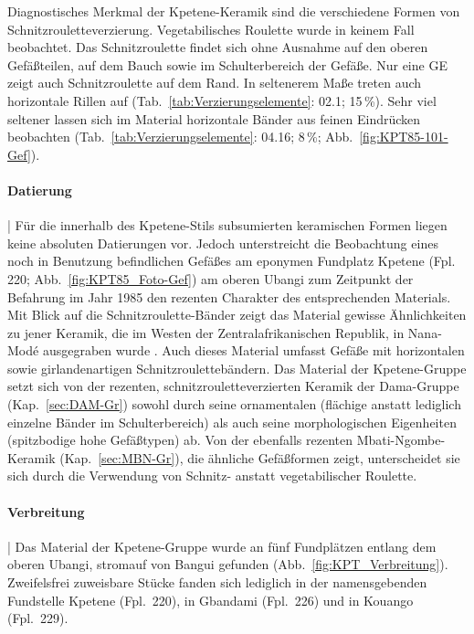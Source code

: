 Diagnostisches Merkmal der Kpetene-Keramik sind die verschiedene Formen von Schnitzrouletteverzierung. Vegetabilisches \mbox{Roulette} wurde in keinem Fall beobachtet. Das Schnitzroulette findet sich ohne Ausnahme auf den oberen Gefäßteilen, auf dem Bauch sowie im Schulterbereich der Gefäße. Nur eine GE zeigt auch Schnitzroulette auf dem Rand. In seltenerem Maße treten auch horizontale Rillen auf (Tab.~\ref{tab:Verzierungselemente}: 02.1; 15\,\%). Sehr viel seltener lassen sich im Material horizontale Bänder aus feinen Eindrücken beobachten (Tab.~\ref{tab:Verzierungselemente}: 04.16; 8\,\%; Abb.~\ref{fig:KPT85-101-Gef}).

\paragraph{Datierung}\hspace{-.5em}|\hspace{.5em}%
Für die innerhalb des Kpetene-Stils subsumierten keramischen Formen liegen keine absoluten Datierungen vor. Jedoch unterstreicht die Beobachtung eines noch in Benutzung befindlichen Gefäßes am eponymen Fundplatz Kpetene (Fpl. 220; Abb.~\ref{fig:KPT85_Foto-Gef}) am oberen \mbox{Ubangi} zum Zeitpunkt der Befahrung im Jahr 1985 den rezenten Charakter des entsprechenden Materials. Mit Blick auf die Schnitzroulette-Bänder zeigt das Material gewisse Ähnlichkeiten zu jener Keramik, die im Westen der Zentralafrikanischen Republik, in Nana-Modé ausgegraben wurde \parencite[34 Abb.~7,1,3--6]{David.1977}. Auch dieses Material umfasst Gefäße mit horizontalen sowie girlandenartigen Schnitzroulettebändern. Das Material der Kpetene-Gruppe setzt sich von der rezenten, schnitzrouletteverzierten Keramik der Dama-Gruppe (Kap.~\ref{sec:DAM-Gr}) sowohl durch seine ornamentalen (flächige anstatt lediglich einzelne Bänder im Schulterbereich) als auch seine morphologischen Eigenheiten (spitzbodige hohe  Gefäßtypen) ab. Von der ebenfalls rezenten Mbati-Ngombe-Keramik (Kap.~\ref{sec:MBN-Gr}), die ähnliche Gefäßformen zeigt, unterscheidet sie sich durch die Verwendung von Schnitz- anstatt vegetabilischer Roulette.

\paragraph{Verbreitung}\hspace{-.5em}|\hspace{.5em}%
Das Material der Kpetene-Gruppe wurde an fünf Fundplätzen entlang dem oberen \mbox{Ubangi}, stromauf von Bangui gefunden (Abb.~\ref{fig:KPT_Verbreitung}). Zweifelsfrei zuweisbare Stücke fanden sich lediglich in der namensgebenden Fundstelle Kpetene (Fpl.~220), in Gbandami (Fpl.~226) und in Kouango (Fpl.~229). 